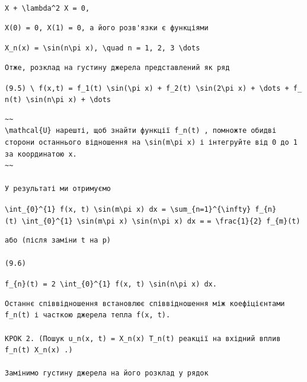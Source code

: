 \documentclass[
  ukrainian,
]{article}
\begin{document}
\texttt{X\textquotesingle{}\textquotesingle{}\ +\ \textbackslash{}lambda\^{}2\ X\ =\ 0,}

\begin{verbatim}
X(0) = 0, X(1) = 0, а його розв'язки є функціями
\end{verbatim}

\texttt{X\_n(x)\ =\ \textbackslash{}sin(n\textbackslash{}pi\ x),\ \textbackslash{}quad\ n\ =\ 1,\ 2,\ 3\ \textbackslash{}dots}

\begin{verbatim}
Отже, розклад на густину джерела представлений як ряд
\end{verbatim}

\texttt{(9.5)\ \textbackslash{}\ f(x,t)\ =\ f\_1(t)\ \textbackslash{}sin(\textbackslash{}pi\ x)\ +\ f\_2(t)\ \textbackslash{}sin(2\textbackslash{}pi\ x)\ +\ \textbackslash{}dots\ +\ f\_n(t)\ \textbackslash{}sin(n\textbackslash{}pi\ x)\ +\ \textbackslash{}dots}

\begin{verbatim}
~~
\mathcal{U} нарешті, щоб знайти функції f_n(t) , помножте обидві сторони останнього відношення на \sin(m\pi x) і інтегруйте від 0 до 1 за координатою x.
~~

У результаті ми отримуємо
\end{verbatim}

\texttt{\textbackslash{}int\_\{0\}\^{}\{1\}\ f(x,\ t)\ \textbackslash{}sin(m\textbackslash{}pi\ x)\ dx\ =\ \textbackslash{}sum\_\{n=1\}\^{}\{\textbackslash{}infty\}\ f\_\{n\}(t)\ \textbackslash{}int\_\{0\}\^{}\{1\}\ \textbackslash{}sin(m\textbackslash{}pi\ x)\ \textbackslash{}sin(n\textbackslash{}pi\ x)\ dx\ =}
\texttt{=\ \textbackslash{}frac\{1\}\{2\}\ f\_\{m\}(t)}

\begin{verbatim}
або (після заміни t на p)

(9.6)
\end{verbatim}

\texttt{f\_\{n\}(t)\ =\ 2\ \textbackslash{}int\_\{0\}\^{}\{1\}\ f(x,\ t)\ \textbackslash{}sin(n\textbackslash{}pi\ x)\ dx.}

\begin{verbatim}
Останнє співвідношення встановлює співвідношення між коефіцієнтами f_n(t) і часткою джерела тепла f(x, t).

КРОК 2. (Пошук u_n(x, t) = X_n(x) T_n(t) реакції на вхідний вплив f_n(t) X_n(x) .)

Замінимо густину джерела на його розклад у рядок
\end{verbatim}
\end{document}

